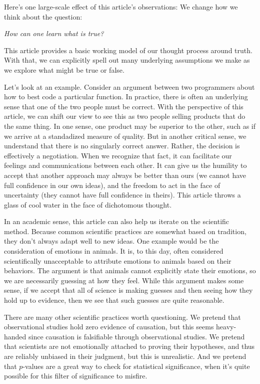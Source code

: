 \documentclass[11pt, oneside]{article}
\begin{document}
Here's one large-scale effect of this article's observations:
We change how we think about the question:

\medskip
\centerline{\em How can one learn what is true?}
\medskip

This article provides a basic working model of our thought process around truth.
With that, we can explicitly spell out many underlying assumptions we
make as we explore what might be true or false.

Let's look at an example. 
Consider an argument between two programmers about how to best code a
particular function.
In practice, there is often an underlying sense that one
of the two people must be correct.
With the perspective of this article, we can
shift our view to see this as two people selling products that do the same
thing.
In one sense, one product may be superior to the other, such as if we
arrive at a standadized measure of quality.
But in another critical
sense, we understand that there is no singularly correct answer.
Rather, the decision is effectively a negotiation.
When we recognize that fact, it
can facilitate our feelings and communications between each other.
It can give
us the humility to accept that another approach may always be better than ours
(we cannot have full confidence in our own ideas),
and the freedom to act in the face of
uncertainty
(they cannot have full confidence in theirs).
This
article throws
a glass of cool water in the face of dichotomous thought.

In an academic sense, this article can also help us iterate on the scientific
method.
Because common scientific practices are somewhat based on tradition,
they don't
always adapt well to new ideas.
One example would be the consideration of emotions in animals.
It is, to this day, often considered scientifically unacceptable to attribute
emotions to animals based on their behaviors. The argument is that animals
cannot explicitly state their emotions, so we are necessarily guessing at how
they feel. While this argument makes some sense, if we accept that all of
science is making guesses and then seeing how they hold up to evidence, then we
see that such guesses are quite reasonable.

There are many other scientific practices worth questioning.
We pretend that observational studies hold zero evidence of causation, but this
seems heavy-handed since causation is falsifiable through observational
studies. We pretend that scientists are not emotionally attached to proving
their hypotheses, and thus are reliably unbiased in their judgment, but this is
unrealistic. And we pretend that $p$-values are a great way to check for
statistical significance, when it's quite possible for this filter of
significance to misfire.
\end{document}
